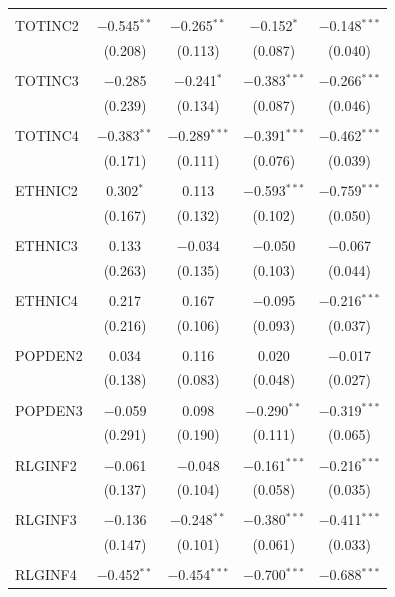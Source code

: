 \begin{tabular}{@{\extracolsep{5pt}}lcccc}
  & & & & \\ 
 TOTINC2 & $-$0.545$^{**}$ & $-$0.265$^{**}$ & $-$0.152$^{*}$ & $-$0.148$^{***}$ \\ 
  & (0.208) & (0.113) & (0.087) & (0.040) \\ 
  & & & & \\ 
 TOTINC3 & $-$0.285 & $-$0.241$^{*}$ & $-$0.383$^{***}$ & $-$0.266$^{***}$ \\ 
  & (0.239) & (0.134) & (0.087) & (0.046) \\ 
  & & & & \\ 
 TOTINC4 & $-$0.383$^{**}$ & $-$0.289$^{***}$ & $-$0.391$^{***}$ & $-$0.462$^{***}$ \\ 
  & (0.171) & (0.111) & (0.076) & (0.039) \\ 
  & & & & \\ 
 ETHNIC2 & 0.302$^{*}$ & 0.113 & $-$0.593$^{***}$ & $-$0.759$^{***}$ \\ 
  & (0.167) & (0.132) & (0.102) & (0.050) \\ 
  & & & & \\ 
 ETHNIC3 & 0.133 & $-$0.034 & $-$0.050 & $-$0.067 \\ 
  & (0.263) & (0.135) & (0.103) & (0.044) \\ 
  & & & & \\ 
 ETHNIC4 & 0.217 & 0.167 & $-$0.095 & $-$0.216$^{***}$ \\ 
  & (0.216) & (0.106) & (0.093) & (0.037) \\ 
  & & & & \\ 
 POPDEN2 & 0.034 & 0.116 & 0.020 & $-$0.017 \\ 
  & (0.138) & (0.083) & (0.048) & (0.027) \\ 
  & & & & \\ 
 POPDEN3 & $-$0.059 & 0.098 & $-$0.290$^{**}$ & $-$0.319$^{***}$ \\ 
  & (0.291) & (0.190) & (0.111) & (0.065) \\ 
  & & & & \\ 
 RLGINF2 & $-$0.061 & $-$0.048 & $-$0.161$^{***}$ & $-$0.216$^{***}$ \\ 
  & (0.137) & (0.104) & (0.058) & (0.035) \\ 
  & & & & \\ 
 RLGINF3 & $-$0.136 & $-$0.248$^{**}$ & $-$0.380$^{***}$ & $-$0.411$^{***}$ \\ 
  & (0.147) & (0.101) & (0.061) & (0.033) \\ 
  & & & & \\ 
 RLGINF4 & $-$0.452$^{**}$ & $-$0.454$^{***}$ & $-$0.700$^{***}$ & $-$0.688$^{***}$ \\ 

\end{tabular}
